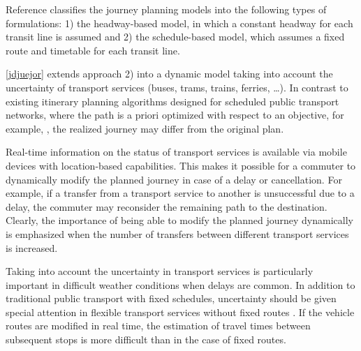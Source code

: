 \documentclass[dissertation,draft*]{aaltoseries}
\begin{document}
Reference \cite{zografos} classifies the journey planning models into
the following types of formulations: 1) the headway-based model, in which
a constant headway for each transit line is assumed \cite{wong1998}
and 2) the schedule-based model, which assumes a
fixed route and timetable for each transit line.

\ref{jdjuejor} extends approach 2) into a dynamic model taking into account the 
uncertainty of transport services (buses, trams, trains, ferries, \ldots). 
In contrast to existing itinerary planning algorithms designed for scheduled public transport networks, 
where the path is a priori optimized with respect to an objective, for example,
\cite{androutsopoulos}, the realized journey may differ from the original plan. 

Real-time information on the status of transport services is available via mobile devices 
with location-based capabilities. This makes it possible for a commuter to
dynamically modify the planned journey in case of a delay or cancellation.
For example, if a transfer from a transport service
to another is unsuccessful due to a delay, the commuter may reconsider the 
remaining path to the destination. 
Clearly, the importance of being able to modify the planned journey dynamically
is emphasized when the number of transfers between different transport services is increased.

Taking into account the uncertainty in transport services is particularly important in difficult weather conditions
when delays are common. In addition to traditional public transport with fixed schedules, uncertainty 
should be given special attention in flexible transport 
services without fixed routes \cite{mulley}. If the vehicle routes are modified 
in real time, the estimation of travel times between subsequent stops is more difficult than in the case
of fixed routes.
\end{document}
